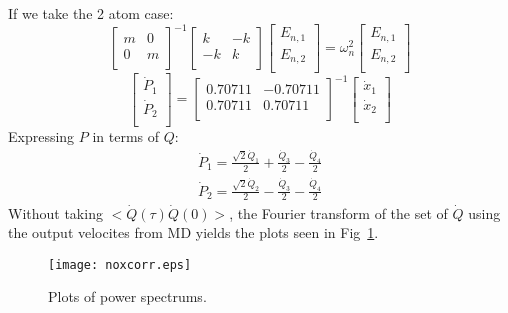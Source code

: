 If we take the 2 atom case:
\begin{equation}
\begin{bmatrix}
   m & 0  \\
   0 & m  \\
\end{bmatrix}^{-1}
\begin{bmatrix}
    k & -k  \\
   -k & k  \\
\end{bmatrix}
\begin{bmatrix}
   E_{n,1} \\
   E_{n,2} \\
\end{bmatrix}
=\omega^2_n
\begin{bmatrix}
   E_{n,1} \\
   E_{n,2} \\
\end{bmatrix}
\end{equation}
\begin{equation}
\begin{bmatrix}
   \dot{P}_1\\
   \dot{P}_2\\
\end{bmatrix}=
\begin{bmatrix}
  0.70711 &  -0.70711 \\
  0.70711 &  0.70711 \\
\end{bmatrix}^{-1}
\begin{bmatrix}
   \dot{x}_1\\
   \dot{x}_2\\
\end{bmatrix}
\end{equation}
Expressing $P$ in terms of $Q$:
\begin{align}
\dot{P}_1=\frac{\sqrt{2}\dot{Q}_1}{2}+\frac{\dot{Q}_3}{2}-\frac{\dot{Q}_4}{2}\\
\dot{P}_2=\frac{\sqrt{2}\dot{Q}_2}{2}-\frac{\dot{Q}_3}{2}-\frac{\dot{Q}_4}{2}
\end{align}
Without taking $<\dot{Q}(\tau)\dot{Q}(0)>$, the Fourier transform of the set of $\dot{Q}$ using the output velocites from MD yields the plots seen in Fig~\ref{fig:appendixb}.
\begin{figure}[!h]
\centering
\texttt{[image: noxcorr.eps]}
\caption{Plots of power spectrums.}
\label{fig:appendixb}
\end{figure}

